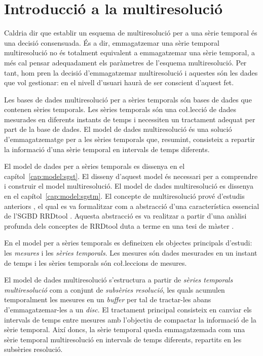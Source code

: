 \section{Introducció a la multiresolució}


\todo{}
Caldria dir que establir un esquema de multiresolució per a una sèrie temporal és una decisió consensuada. És a dir, emmagatzemar una sèrie temporal multiresolució no és totalment equivalent a emmagatzemar una sèrie temporal, a més cal pensar adequadament els paràmetres de l'esquema multiresolució. Per tant, hom pren la decisió d'emmagatzemar multiresolució i aquestes són les dades que vol gestionar: en el nivell d'usuari haurà de ser conscient d'aquest fet.


Les bases de dades multiresolució per a sèries temporals són bases de dades que contenen sèries temporals. Les sèries temporals són una co\l.lecció de dades mesurades en diferents instants de temps i necessiten un tractament adequat per part de la base de dades. 
El model de dades multiresolució és una solució d'emmagatzematge per a les sèries temporals que, resumint, consisteix a repartir la informació d'una sèrie temporal en intervals de temps diferents.


El model de dades per a sèries temporals es dissenya en el
capítol~\ref{cap:model:sgst}. El disseny d'aquest model és necessari
per a comprendre i construir el model multiresolució.  El model de
dades multiresolució es dissenya en el capítol~\ref{cap:model:sgstm}.
El concepte de multiresolució prové d'estudis anteriors
\parencite{llusa12:ptd}, el qual es va formalitzar com a abstracció
d'una característica essencial de l'SGBD
RRDtool \parencite{rrdtool}. Aquesta abstracció es va realitzar a
partir d'una anàlisi profunda dels conceptes de RRDtool duta a terme
en una tesi de màster \parencite{llusa11:tfm}.




En el model per a sèries temporals es defineixen els objectes principals d'estudi: les \emph{mesures} i les \emph{sèries temporals}. Les mesures són dades mesurades en un instant de temps i les sèries temporals són co\l.leccions de mesures.

El model de dades multiresolució s'estructura a partir de \emph{sèries temporals multiresolució} com a conjunt de \emph{subsèries resolució}, les quals  acumulen temporalment les mesures en un \emph{buffer} per tal de tractar-les abans d'emmagatzemar-les  a un \emph{disc}. El tractament principal consisteix en canviar els intervals de temps entre mesures amb l'objectiu de compactar la informació de la sèrie temporal.
Així doncs, la sèrie temporal queda emmagatzemada com una sèrie temporal multiresolució en intervals de temps diferents, repartits en les subsèries resolució. 

